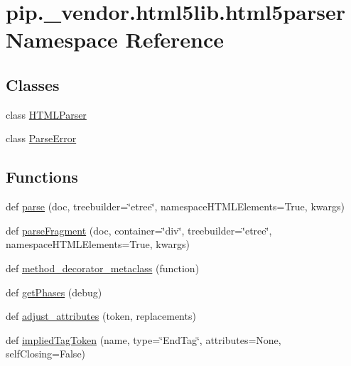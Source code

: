 \hypertarget{namespacepip_1_1__vendor_1_1html5lib_1_1html5parser}{}\section{pip.\+\_\+vendor.\+html5lib.\+html5parser Namespace Reference}
\label{namespacepip_1_1__vendor_1_1html5lib_1_1html5parser}
\subsection*{Classes}
\begin{DoxyCompactItemize}
\item 
class \hyperlink{classpip_1_1__vendor_1_1html5lib_1_1html5parser_1_1HTMLParser}{H\+T\+M\+L\+Parser}
\item 
class \hyperlink{classpip_1_1__vendor_1_1html5lib_1_1html5parser_1_1ParseError}{Parse\+Error}
\end{DoxyCompactItemize}
\subsection*{Functions}
\begin{DoxyCompactItemize}
\item 
def \hyperlink{namespacepip_1_1__vendor_1_1html5lib_1_1html5parser_ae565e9d5d0a8f43e8cff738384b1ad7b}{parse} (doc, treebuilder=\char`\"{}etree\char`\"{}, namespace\+H\+T\+M\+L\+Elements=True, kwargs)
\item 
def \hyperlink{namespacepip_1_1__vendor_1_1html5lib_1_1html5parser_a8e8ea380817e3400dbda236e66ea6147}{parse\+Fragment} (doc, container=\char`\"{}div\char`\"{}, treebuilder=\char`\"{}etree\char`\"{}, namespace\+H\+T\+M\+L\+Elements=True, kwargs)
\item 
def \hyperlink{namespacepip_1_1__vendor_1_1html5lib_1_1html5parser_a59bf9ed648bd8cfe1bfc6756627c1b26}{method\+\_\+decorator\+\_\+metaclass} (function)
\item 
def \hyperlink{namespacepip_1_1__vendor_1_1html5lib_1_1html5parser_a5ee39623fbd3cfa851e37def46a978d4}{get\+Phases} (debug)
\item 
def \hyperlink{namespacepip_1_1__vendor_1_1html5lib_1_1html5parser_a3e86a41447e2a8e818ccbb654bec63fc}{adjust\+\_\+attributes} (token, replacements)
\item 
def \hyperlink{namespacepip_1_1__vendor_1_1html5lib_1_1html5parser_a8fd794786fda4c4be7bdcd7e9b7ce89f}{implied\+Tag\+Token} (name, type=\char`\"{}End\+Tag\char`\"{}, attributes=None, self\+Closing=False)
\end{DoxyCompactItemize}
